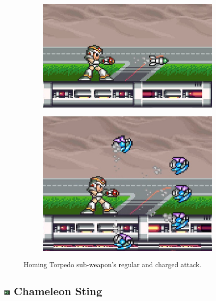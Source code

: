 \begin{figure}[htp]
	\centering
	\begin{subfigure}{0.39\linewidth}
		\includegraphics[width=\linewidth]{figures/X1/weapons/Homing_torpedo_1.jpg}	
	\end{subfigure}
	\begin{subfigure}{0.3\linewidth}
		\includegraphics[width=\linewidth]{figures/X1/weapons/Homing_torpedo_2.jpg}	
	\end{subfigure}
	\caption{Homing Torpedo sub-weapon's regular and charged attack.}
\end{figure}

\subsection{\includegraphics[width=12px, height=10px]{figures/X1/weapons/C_sting.jpg} Chameleon Sting}\label{Chameleon_sting}

